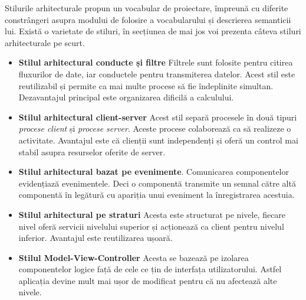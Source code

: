 \documentclass[a4paper,12pt,oneside]{report}
\begin{document}
Stilurile arhitecturale propun un vocabular de proiectare, împreună cu diferite constrângeri asupra modului de folosire a vocabularului și descrierea semanticii lui.
Există o varietate de stiluri, în secțiunea de mai jos voi prezenta câteva stiluri arhitecturale pe scurt.
\begin{itemize}
    \item \textbf{Stilul arhitectural conducte și filtre} Filtrele sunt folosite pentru citirea fluxurilor de date, iar conductele pentru transmiterea datelor. Acest stil este reutilizabil și permite ca mai multe procese să fie îndeplinite simultan. Dezavantajul principal este organizarea dificilă a calculului.
    \item \textbf{Stilul arhitectural client-server} Acest stil separă procesele în două tipuri \textit{procese client} și \textit{procese server}. Aceste procese colaborează ca să realizeze o activitate. Avantajul este că clienții sunt independenți și oferă un control mai stabil asupra resurselor oferite de server.
    \item \textbf{Stilul arhitectural bazat pe evenimente}. Comunicarea componentelor evidențiază evenimentele. Deci o componentă transmite un semnal către altă componentă în legătură cu apariția unui eveniment la înregistrarea acestuia.
    \item \textbf{Stilul arhitectural pe straturi} Acesta este structurat pe nivele, fiecare nivel oferă servicii nivelului superior și acționează ca client pentru nivelul inferior. Avantajul este reutilizarea ușoară.
    \item \textbf{Stilul Model-View-Controller} Acesta se bazează pe izolarea componentelor logice față de cele ce țin de interfața utilizatorului. Astfel aplicația devine mult mai ușor de modificat pentru că nu afectează alte nivele.
    \end{itemize}
\end{document}
